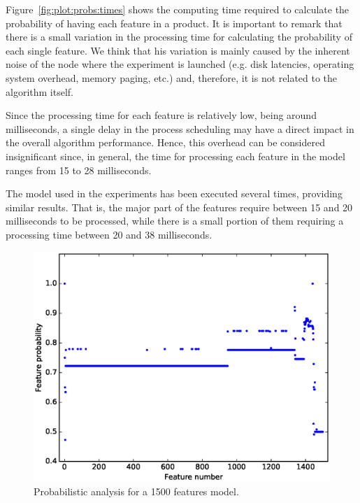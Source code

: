 Figure~\ref{fig:plot:probs:times} shows the computing time required to calculate the probability of having
each feature in a product.
It is important to remark that there is a small variation in the processing time for calculating the probability of each single feature. We think that his variation is mainly caused by the inherent noise of the node where the experiment is launched (e.g. disk latencies, operating
system overhead, memory paging, etc.) and, therefore, it is not related to the algorithm itself.

Since the processing time for each feature is relatively low, being around milliseconds, a single delay in
the process scheduling may have a direct impact in the overall algorithm performance. Hence, this overhead
can be considered insignificant since, in general, the time for processing each feature in the model ranges
from 15 to 28 milliseconds.

The model used in the experiments has been executed several times, providing similar results. That is, the
major part of the features require between 15 and 20 milliseconds to be processed, while there is a small
portion of them requiring a processing time between 20 and 38 milliseconds.

\begin{figure}[h]
        \centering
        \linefigure
        \includegraphics[width=0.8\hsize,angle=0]{plot_probs_probs.eps}
        \linefigure
        \caption{Probabilistic analysis for a 1500 features model.}\label{fig:plot:probs:probs}
\end{figure}

